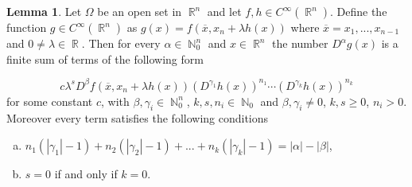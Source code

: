 \documentclass[12pt]{article}
\theoremstyle{definition}
\newtheorem{lemma}{Lemma}
\DeclareMathOperator\rr{\mathbb{R}}
\DeclareMathOperator\nn{\mathbb{N}}
\begin{document}
\begin{lemma}\label{derivatives}
Let $\Omega$ be an open set in $\rr^n$ and let $f,h \in C^\infty(\rr^n)$. Define the function $g\in C^\infty(\rr^n)$ as $g(x)=f(\overline x, x_n+\lambda h(x))$ where $\overline x=x_1,...,x_{n-1}$ and $0\neq\lambda \in \rr.$ Then for every $\alpha \in \nn_0^n$ and $x \in \rr^n$ the number $D^\alpha g(x)$ is a finite sum of terms of the following form

\[
c\lambda^s D^{\beta} f(\overline x, x_n+\lambda h(x))(D^{\gamma_1}h(x))^{n_1}\cdots (D^{\gamma_k}h(x))^{n_k}
\]
for some constant $c$, with $\beta,\gamma_i \in \nn_0^n $, $k,s,n_i \in \nn_0$ and $\beta,\gamma_i\neq0$, $k,s\ge 0$, $n_i>0$. Moreover every term satisfies the following conditions
\begin{enumerate}[a)]
\item $n_1(|\gamma_1|-1)+n_2(|\gamma_2|-1)+...+n_k(|\gamma_k|-1)=|\alpha|-|\beta|$,
\item  $s=0$ if and only if $k=0$.
\end{enumerate}
\end{lemma}
\end{document}
